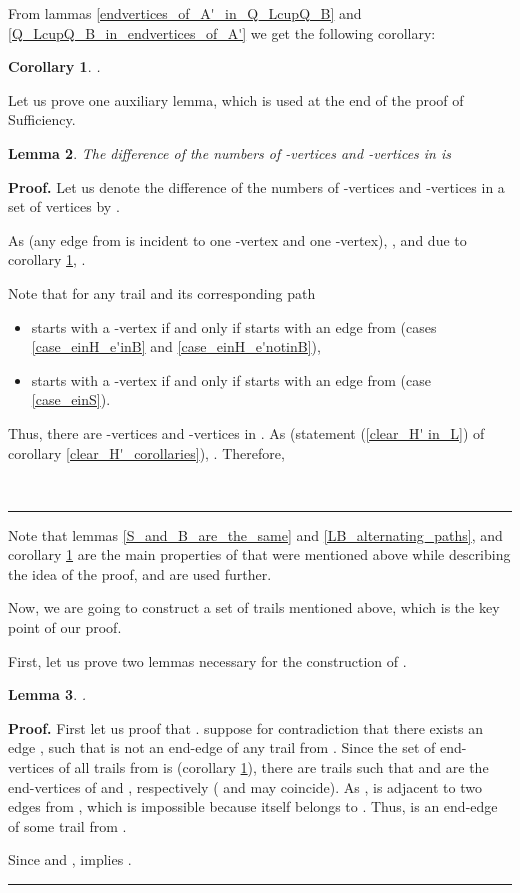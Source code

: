 \documentclass[a4paper, 12pt]{article}
\newtheorem{lemma}{Lemma}[subsection]
\newtheorem{corollary}[lemma]{Corollary}
\newenvironment{proof}[1][Proof]{\noindent\textbf{#1.} }{\ \rule{0.5em}{0.5em}}
\begin{document}
\bigskip

From lammas \ref{endvertices_of_A'_in_Q_LcupQ_B} and
\ref{Q_LcupQ_B_in_endvertices_of_A'} we get the following corollary:
\begin{corollary}\label{V_0=Q_LcupQ_B}
.
\end{corollary}

\bigskip

Let us prove one auxiliary lemma, which is used at the end of the
proof of Sufficiency.
\begin{lemma}\label{2-3}
The difference of the numbers of -vertices and -vertices in
 is 
\end{lemma}
\begin{proof}
Let us denote the difference of the numbers of -vertices and
-vertices in a set of vertices  by .

As  (any edge from  is incident to one
-vertex and one -vertex), , and due to corollary \ref{V_0=Q_LcupQ_B}, .

Note that for any trail  and its corresponding path 
\begin{itemize}
\item  starts with a -vertex if and only if  starts
with an edge from  (cases \ref{case_einH_e'inB} and
\ref{case_einH_e'notinB}),
\item  starts with a -vertex if and only if  starts
with an edge from  (case \ref{case_einS}).
\end{itemize}
Thus, there are  -vertices and
 -vertices in . As
 (statement (\ref{clear_H' in_L})
of corollary \ref{clear_H'_corollaries}),
. Therefore,


\end{proof}

\bigskip

Note that lemmas \ref{S_and_B_are_the_same} and
\ref{LB_alternating_paths}, and corollary \ref{V_0=Q_LcupQ_B} are
the main properties of  that were mentioned above while
describing the idea of the proof, and are used further.

\bigskip

Now, we are going to construct a set of trails  mentioned
above, which is the key point of our proof.

First, let us prove two lemmas necessary for the construction of
.
\begin{lemma}\label{TL_in_endedges}
.
\end{lemma}
\begin{proof}
First let us proof that . suppose for
contradiction that there exists an edge , such
that  is not an end-edge of any trail from . Since the set of
end-vertices of all trails from  is  (corollary
\ref{V_0=Q_LcupQ_B}), there are trails  such that
 and  are the end-vertices of  and , respectively
( and  may coincide). As ,  is adjacent to two edges from , which is
impossible because  itself belongs to . Thus,  is an
end-edge of some trail  from .

Since  and
, implies .
\end{proof}
\end{document}

